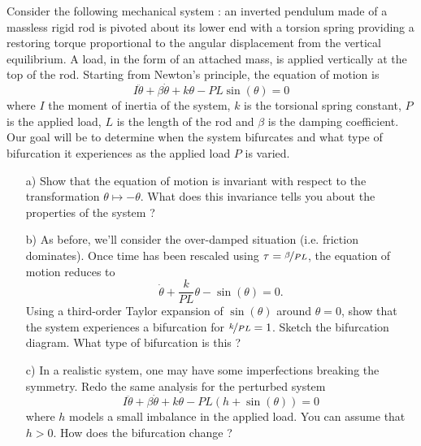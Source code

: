\begin{problem}
  Consider the following mechanical system : an inverted pendulum made of a massless rigid rod is pivoted about its lower end with a torsion spring providing a restoring torque proportional to the angular displacement from the vertical equilibrium.
  A load, in the form of an attached mass, is applied vertically at the top of the rod.
  Starting from Newton's principle, the equation of motion is
  \[
  I \ddot{\theta} + \beta \dot{\theta} + k \theta - PL \sin(\theta) = 0
  \]
  where $I$ the moment of inertia of the system, $k$ is the torsional spring constant, $P$ is the applied load, $L$ is the length of the rod and $\beta$ is the damping coefficient.
  Our goal will be to determine when the system bifurcates and what type of bifurcation it experiences as the applied load $P$ is varied.

  \bigskip

  \begin{enumerate}

  \item[a)] Show that the equation of motion is invariant with respect to the transformation $\theta \mapsto -\theta$.
    What does this invariance tells you about the properties of the system ?

  \item[b)] As before, we'll consider the over-damped situation (i.e. friction dominates).
    Once time has been rescaled using $\tau = \nicefrac{\beta}{PL}$, the equation of motion reduces to
    \[
    \dot{\theta} + \dfrac{k}{PL}\theta - \sin(\theta) = 0.
    \]
    Using a third-order Taylor expansion of $\sin(\theta)$ around $\theta = 0$, show that the system experiences a bifurcation for $\nicefrac{k}{PL} = 1$.
    Sketch the bifurcation diagram.
    What type of bifurcation is this ?

  \item[c)] In a realistic system, one may have some imperfections breaking the symmetry.
    Redo the same analysis for the perturbed system
    \[
    I \ddot{\theta} + \beta \dot{\theta} + k \theta - PL \left( h + \sin(\theta) \right) = 0
    \]
    where $h$ models a small imbalance in the applied load.
    You can assume that $h > 0$.
    How does the bifurcation change ?
  \end{enumerate}

\end{problem}

\bigskip

